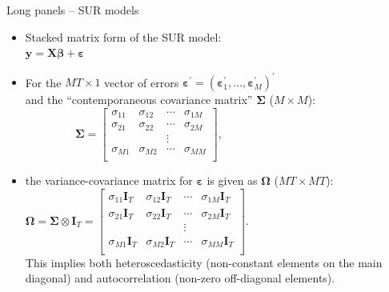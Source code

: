\documentclass[usenames,dvipsnames]{beamer}
\begin{document}
\begin{frame}{Long panels -- SUR models}
\small
\begin{itemize}
    \item Stacked matrix form of the SUR model:\\ \smallskip 
    $\bm{y} = \bm{X} \bm{\beta} + \bm{\varepsilon}$\\ \smallskip 
    \medskip
    \item For the $MT \times 1$ vector of errors $\bm{\varepsilon}^{\prime} = (\bm{\varepsilon}_1^{\prime},\dots,\bm{\varepsilon}_M^{\prime})^{\prime}$\\
    and the ``contemporaneous covariance matrix'' $\bm{\Sigma}$ ($M \times M$):\\ \medskip
    $\qquad \qquad ~~\bm{\Sigma} = 
    \begin{bmatrix} 
    \sigma_{11} & \sigma_{12} & \cdots & \sigma_{1M} \\ 
    \sigma_{21} & \sigma_{22} & \cdots & \sigma_{2M} \\ 
      &   & \vdots &  \\ 
    \sigma_{M1} & \sigma_{M2} & \cdots & \sigma_{MM} \\ 
    \end{bmatrix},$ \\ \medskip
    \item the variance-covariance matrix for $\bm{\varepsilon}$ is given as $\bm{\Omega}$ ($MT \times MT$):\\ \medskip
    $\bm{\Omega} = \bm{\Sigma} \otimes \bm{I}_T = 
    \begin{bmatrix} 
    \sigma_{11} \bm{I}_T & \sigma_{12} \bm{I}_T & \cdots & \sigma_{1M} \bm{I}_T \\ 
    \sigma_{21} \bm{I}_T & \sigma_{22} \bm{I}_T & \cdots & \sigma_{2M} \bm{I}_T \\ 
      &   & \vdots &  \\ 
    \sigma_{M1} \bm{I}_T & \sigma_{M2} \bm{I}_T & \cdots & \sigma_{MM} \bm{I}_T \\ 
    \end{bmatrix}.$\\ \smallskip
    This implies both heteroscedasticity (non-constant elements on the main diagonal) and autocorrelation (non-zero off-diagonal elements).
\end{itemize}
\end{frame}
\end{document}
